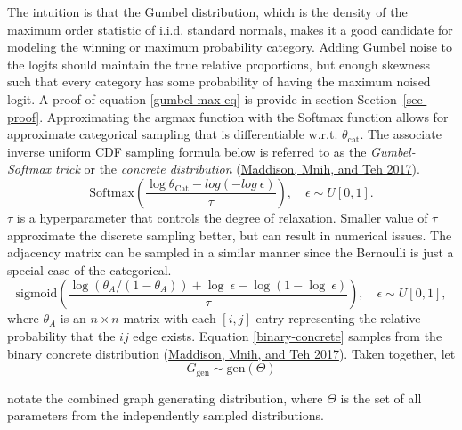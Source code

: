 \documentclass[
  11pt,
  letterpaper,
]{article}
\begin{document}
The intuition is that the Gumbel distribution, which is the density of
the maximum order statistic of i.i.d. standard normals, makes it a good
candidate for modeling the winning or maximum probability category.
Adding Gumbel noise to the logits should maintain the true relative
proportions, but enough skewness such that every category has some
probability of having the maximum noised logit. A proof of equation
\ref{gumbel-max-eq} is provide in section Section~\ref{sec-proof}.
Approximating the argmax function with the Softmax function allows for
approximate categorical sampling that is differentiable w.r.t.
\(\theta_\text{cat}\). The associate inverse uniform CDF sampling
formula below is referred to as the \emph{Gumbel-Softmax trick} or the
\emph{concrete distribution}
(\protect\hyperlink{ref-Maddison_Mnih_Teh_2017}{Maddison, Mnih, and Teh
2017}). \begin{equation}
    \text{Softmax}
    \left(
        \dfrac{\log \theta_{\text{Cat}} - log(-log \ \epsilon)}{\tau}
    \right), \quad \epsilon \sim U[0, 1].
\end{equation} \(\tau\) is a hyperparameter that controls the degree of
relaxation. Smaller value of \(\tau\) approximate the discrete sampling
better, but can result in numerical issues. The adjacency matrix can be
sampled in a similar manner since the Bernoulli is just a special case
of the categorical.\\
\begin{equation} \label{binary-concrete}
        \text{sigmoid}
            \left(\dfrac{\log(\theta_A / (1 - \theta_A)) + \log \ \epsilon - \log(1 - \log \ \epsilon)}{\tau} \right), \quad \epsilon \sim U[0, 1], 
    \end{equation} where \(\theta_A\) is an \(n \times n\) matrix with
each \([i, j]\) entry representing the relative probability that the
\(ij\) edge exists. Equation \ref{binary-concrete} samples from the
binary concrete distribution
(\protect\hyperlink{ref-Maddison_Mnih_Teh_2017}{Maddison, Mnih, and Teh
2017}). Taken together, let\\
\[
    G_{\text{gen}} \sim \text{gen}(\Theta)  
\]

notate the combined graph generating distribution, where \(\Theta\) is
the set of all parameters from the independently sampled distributions.
\end{document}
